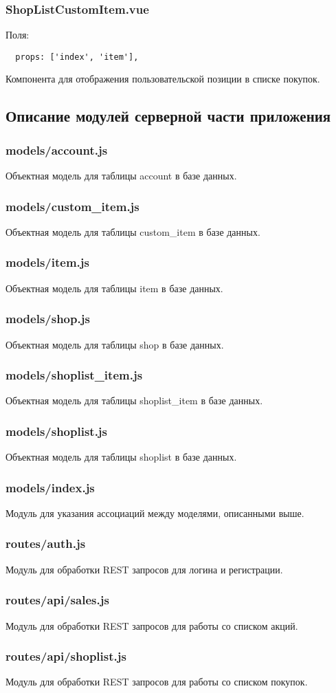 \subsubsection{ShopListCustomItem.vue}
Поля:
\begin{verbatim}
  props: ['index', 'item'],
\end{verbatim}
Компонента для отображения пользовательской позиции в списке покупок.

\subsection{Описание модулей серверной части приложения}

\subsubsection{models/account.js}
Объектная модель для таблицы account в базе данных.

\subsubsection{models/custom\_item.js}
Объектная модель для таблицы custom\_item в базе данных.

\subsubsection{models/item.js}
Объектная модель для таблицы item в базе данных.

\subsubsection{models/shop.js}
Объектная модель для таблицы shop в базе данных.

\subsubsection{models/shoplist\_item.js}
Объектная модель для таблицы shoplist\_item в базе данных.

\subsubsection{models/shoplist.js}
Объектная модель для таблицы shoplist в базе данных.

\subsubsection{models/index.js}
Модуль для указания ассоциаций между моделями, описанными выше.

\subsubsection{routes/auth.js}
Модуль для обработки REST запросов для логина и регистрации.

\subsubsection{routes/api/sales.js}
Модуль для обработки REST запросов для работы со списком акций.

\subsubsection{routes/api/shoplist.js}
Модуль для обработки REST запросов для работы со списком покупок.
